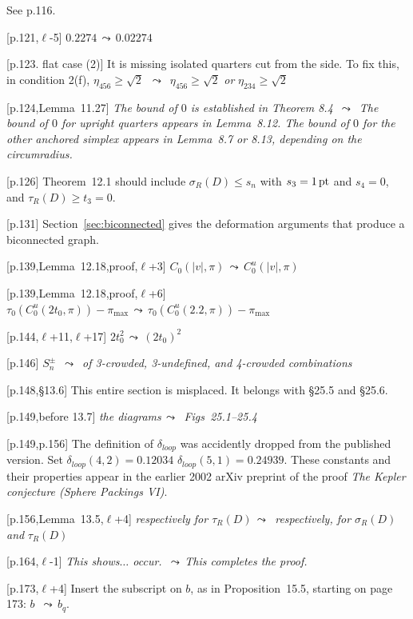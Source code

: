 \documentclass[11pt]{amsart}
\def\op#1{{\text{#1}}}
\def\lto{\ensuremath{\,\leadsto\,}}
\def\line{$\ell$}
\def\text{\hbox}
\def\sz{small} %
\def\rmx{\rm}
\begin{document}
\begin{\sz}
[p.121] {\rmx See p.116.}

[p.121,\line-5]
	$
	0.2274 \lto 0.02274
	$


	
[p.123. flat case (2)]  {\rmx It is missing
isolated quarters cut from the side.
To fix this, in condition 2(f), }
	$
	\eta_{456}\ge\sqrt2$ \lto
	$\eta_{456}\ge\sqrt2$ {\it or } $\eta_{234}\ge\sqrt2$
	
[p.124,Lemma~11.27]  {\it The bound of $0$ is established in Theorem 8.4} \lto
{\it The bound of $0$ for upright quarters appears in Lemma~8.12.  The bound of $0$ for the other anchored simplex appears in Lemma~8.7 or 8.13, depending on the circumradius.}
	

[p.126] 
{\rmx Theorem~12.1 should include $\sigma_R(D)\le s_n$
with $s_3 = 1\,\op{pt}$ and $s_4=0$, and
$\tau_R(D) \ge t_3 = 0$.}

[p.131] {\rmx Section~\ref{sec:biconnected} gives
the deformation arguments that produce a biconnected graph.}


[p.139,Lemma~12.18,proof,\line+3] 
	$C_0(|v|,\pi) \lto
	C_0^u(|v|,\pi)
	$
	
[p.139,Lemma~12.18,proof,\line+6] 
	$
	\tau_0(C_0^u(2t_0,\pi))-\pi_{\max}\lto
	\tau_0(C_0^u(2.2,\pi))-\pi_{\max}
	$

[p.144,\line+11,\line+17]
	$2t_0^2 \lto (2t_0)^2
	$

[p.146]
		$S_n^\pm$ \lto
	{\it of 3-crowded, 3-undefined, and
	4-crowded combinations}

[p.148,\S13.6]  {\rmx This entire
section is misplaced.  It belongs with
\S25.5 and \S25.6.}

[p.149,before 13.7]
{\it the diagrams\lto
	Figs~25.1--25.4}

[p.149,p.156] {\rmx The definition of $\delta_{loop}$ was accidently
dropped from the published version.  Set $\delta_{loop}(4,2)=0.12034 $
$\delta_{loop}(5,1)=0.24939$.  These constants and their properties
appear in the earlier 2002
arXiv preprint of the proof {\it The Kepler conjecture (Sphere Packings VI)}.
}

[p.156,Lemma~13.5,\line+4]
	{\it respectively for $\tau_R(D)$\lto
	respectively, for $\sigma_R(D)$ and }
	$\tau_R(D)$ 

[p.164,\line-1] 
	{\it This shows$\ldots$ occur.
	\lto This completes the proof.}


[p.173,\line+4] {\rmx Insert the subscript on $b$,
as in Proposition~15.5, starting on page 173:}
   $b$ \lto $b_q$.




\end{\sz}
\end{document}
